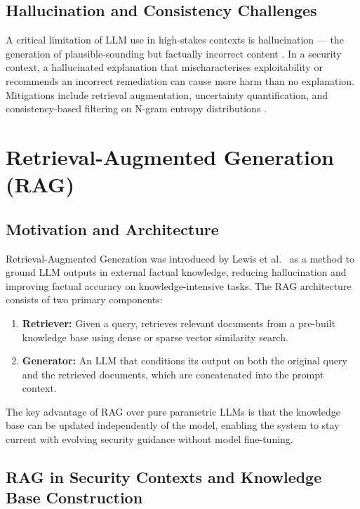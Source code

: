 \subsection{Hallucination and Consistency Challenges}

A critical limitation of LLM use in high-stakes contexts is hallucination --- the generation of plausible-sounding but factually incorrect content \cite{ji2023survey}. In a security context, a hallucinated explanation that mischaracterises exploitability or recommends an incorrect remediation can cause more harm than no explanation. Mitigations include retrieval augmentation, uncertainty quantification, and consistency-based filtering on N-gram entropy distributions \cite{kuhn2023semantic}.

\section{Retrieval-Augmented Generation (RAG)}
\label{sec:rag_background}

\subsection{Motivation and Architecture}

Retrieval-Augmented Generation was introduced by Lewis et al.\ \cite{lewis2020retrieval} as a method to ground LLM outputs in external factual knowledge, reducing hallucination and improving factual accuracy on knowledge-intensive tasks. The RAG architecture consists of two primary components:

\begin{enumerate}
  \item \textbf{Retriever:} Given a query, retrieves relevant documents from a pre-built knowledge base using dense or sparse vector similarity search.
  \item \textbf{Generator:} An LLM that conditions its output on both the original query and the retrieved documents, which are concatenated into the prompt context.
\end{enumerate}

The key advantage of RAG over pure parametric LLMs \cite{brown2020language} is that the knowledge base can be updated independently of the model, enabling the system to stay current with evolving security guidance without model fine-tuning.

\subsection{RAG in Security Contexts and Knowledge Base Construction}

